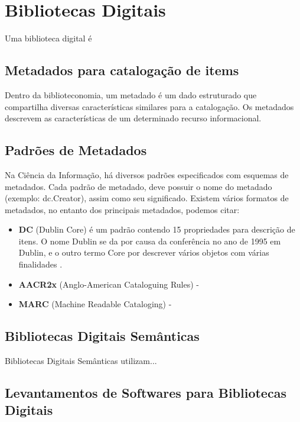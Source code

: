 \chapter{Bibliotecas Digitais}
Uma biblioteca digital é

\section{Metadados para catalogação de items}
Dentro da biblioteconomia, um metadado é um dado estruturado que compartilha diversas características similares para a catalogação. Os metadados descrevem as características de um determinado recurso informacional.
	
\section{Padrões de Metadados}
%
Na Ciência da Informação, há diversos padrões especificados com esquemas de metadados. Cada padrão de metadado, deve possuir o nome do metadado (exemplo: dc.Creator), assim como seu significado. Existem vários formatos de metadados, no entanto dos principais metadados, podemos citar:

\begin{itemize}
\item \textbf{DC} (Dublin Core) é um padrão contendo 15 propriedades para descrição de itens. O nome Dublin se da por causa da conferência no ano de 1995 em Dublin, e o outro termo Core por descrever vários objetos com várias finalidades \cite{dbcore2012set}.

\item \textbf{AACR2x} (Anglo-American Cataloguing Rules) - 
\item \textbf{MARC} (Machine Readable Cataloging) - 
\end{itemize}


\section{Bibliotecas Digitais Semânticas}
%
Bibliotecas Digitais Semânticas utilizam...

\section{Levantamentos de Softwares para Bibliotecas Digitais}

